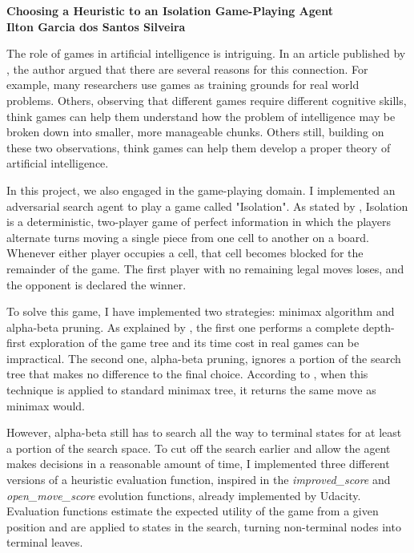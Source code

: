 \documentclass[a4paper]{article}
\begin{document}

\begin{center}

{\bf \large Choosing a Heuristic to an Isolation Game-Playing Agent \\ \small Ilton Garcia dos Santos Silveira}
\end{center}



The role of games in artificial intelligence is intriguing. In an article published by \cite{Economist2017}, the author argued that there are several reasons for this connection. For example, many researchers use games as training grounds for real world problems. Others, observing that different games require different cognitive skills, think games can help them understand how the problem of intelligence may be broken down into smaller, more manageable chunks. Others still, building on these two observations, think games can help them develop a proper theory of artificial intelligence.

In this project, we also engaged in the game-playing domain. I implemented an adversarial search agent to play a game called "Isolation". As stated by \cite{Udacity2017}, Isolation is a deterministic, two-player game of perfect information in which the players alternate turns moving a single piece from one cell to another on a board. Whenever either player occupies a cell, that cell becomes blocked for the remainder of the game. The first player with no remaining legal moves loses, and the opponent is declared the winner.

To solve this game, I have implemented two strategies: minimax algorithm and alpha-beta pruning. As explained by \cite{russelartificial}, the first one performs a complete depth-first exploration of the game tree and its time cost in real games can be impractical. The second one, alpha-beta pruning, ignores a portion of the search tree that makes no difference to the final choice. According to \cite{russelartificial}, when this technique is applied to standard minimax tree, it returns the same move as minimax would.

However, alpha-beta still has to search all the way to terminal states for at least a portion of the search space. To cut off the search earlier and allow the agent makes decisions in a reasonable amount of time, I implemented three different versions of a heuristic evaluation function, inspired in the \textit{improved\_score} and \textit{open\_move\_score} evolution functions, already implemented by Udacity. Evaluation functions estimate the expected utility of the game from a given position and are applied to states in the search,  turning non-terminal nodes into terminal leaves.
\end{document}
